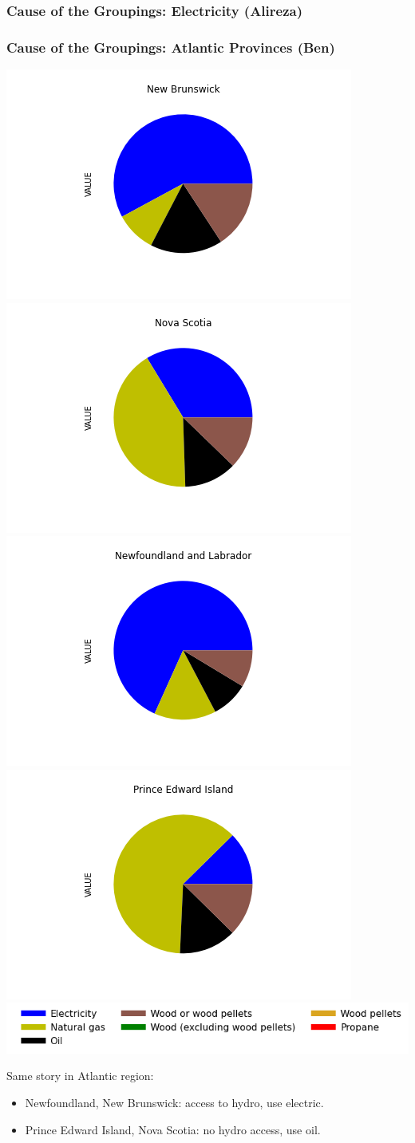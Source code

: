 \documentclass{beamer}
\begin{document}
\begin{frame}
\frametitle{Cause of the Groupings: Electricity (Alireza)}

\end{frame}











\begin{frame}
\frametitle{Cause of the Groupings: Atlantic Provinces (Ben)}

\begin{center}
\includegraphics[width=0.25\linewidth, trim={120pt 50pt 110pt 10pt}, clip]{Ben_Images/NB.png}%
\includegraphics[width=0.25\linewidth, trim={120pt 50pt 110pt 10pt}, clip]{Ben_Images/NS.png}%
\includegraphics[width=0.25\linewidth, trim={120pt 50pt 110pt 10pt}, clip]{Ben_Images/NL.png}%
\includegraphics[width=0.25\linewidth, trim={120pt 50pt 110pt 10pt}, clip]{Ben_Images/PE.png}\\[10pt]
\includegraphics[width=0.8\linewidth]{leg_bar.png}
\end{center}

Same story in Atlantic region:
	\begin{itemize}
		\item Newfoundland, New Brunswick: access to hydro, use electric.
		\item Prince Edward Island, Nova Scotia: no hydro access, use oil.
	\end{itemize}

\end{frame}
\end{document}
